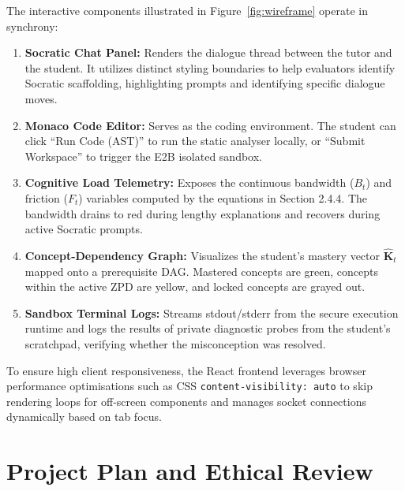 \documentclass[11pt,a4paper]{report}
\begin{document}
The interactive components illustrated in Figure~\ref{fig:wireframe} operate in synchrony:
\begin{enumerate}
    \item \textbf{Socratic Chat Panel:} Renders the dialogue thread between the tutor and the student. It utilizes distinct styling boundaries to help evaluators identify Socratic scaffolding, highlighting prompts and identifying specific dialogue moves.
    \item \textbf{Monaco Code Editor:} Serves as the coding environment. The student can click ``Run Code (AST)'' to run the static analyser locally, or ``Submit Workspace'' to trigger the E2B isolated sandbox.
    \item \textbf{Cognitive Load Telemetry:} Exposes the continuous bandwidth ($B_t$) and friction ($F_t$) variables computed by the equations in Section 2.4.4. The bandwidth drains to red during lengthy explanations and recovers during active Socratic prompts.
    \item \textbf{Concept-Dependency Graph:} Visualizes the student's mastery vector $\hat{\mathbf{K}}_t$ mapped onto a prerequisite DAG. Mastered concepts are green, concepts within the active ZPD are yellow, and locked concepts are grayed out.
    \item \textbf{Sandbox Terminal Logs:} Streams stdout/stderr from the secure execution runtime and logs the results of private diagnostic probes from the student's scratchpad, verifying whether the misconception was resolved.
\end{enumerate}
To ensure high client responsiveness, the React frontend leverages browser performance optimisations such as CSS \texttt{content-visibility: auto} to skip rendering loops for off-screen components and manages socket connections dynamically based on tab focus.

\chapter{Project Plan and Ethical Review}
\label{ch:plan}
\end{document}
